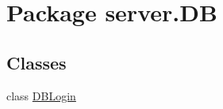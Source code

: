\hypertarget{namespaceserver_1_1DB}{\section{Package server.\-D\-B}
\label{namespaceserver_1_1DB}
}
\subsection*{Classes}
\begin{DoxyCompactItemize}
\item 
class \hyperlink{classserver_1_1DB_1_1DBLogin}{D\-B\-Login}
\end{DoxyCompactItemize}
